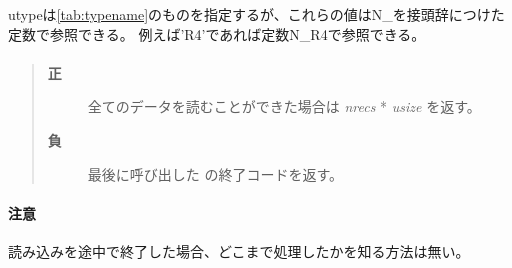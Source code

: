 utypeは\ref{tab:typename}のものを指定するが、これらの値はN\_を接頭辞につけた定数で参照できる。
例えば'R4'であれば定数N\_R4で参照できる。

\paragraph{\ResultCode}
\begin{quote}
\begin{description}
\item[{\bf 正}] 全てのデータを読むことができた場合は {\it nrecs} * {\it usize} を返す。
\item[{\bf 負}] 最後に呼び出した  の終了コードを返す。
\end{description}\end{quote}

\paragraph{注意}
読み込みを途中で終了した場合、どこまで処理したかを知る方法は無い。
